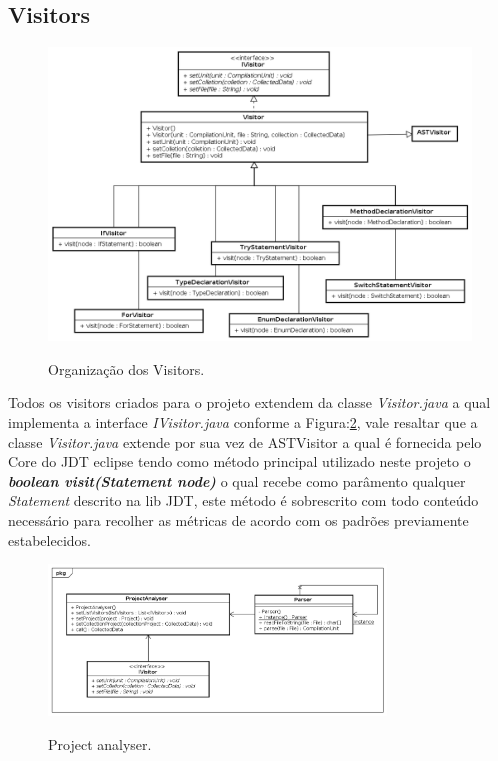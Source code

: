 \subsection{Visitors}
\begin{figure}[h]
\center
\includegraphics[width=1.0\textwidth]{Imagens/Visitors}
\label{fig:arqVisitor}
\caption{Organização dos Visitors.}
\end{figure}

Todos os visitors criados para o projeto extendem da classe \textit{Visitor.java} a qual implementa a interface \textit{IVisitor.java} conforme a Figura:\ref{fig:ProjectAnalyser}, vale resaltar que a classe \textit{Visitor.java} extende por sua vez de ASTVisitor a qual é fornecida pelo Core do JDT eclipse tendo como método principal utilizado neste projeto o \textbf{{\it boolean visit(Statement node)}} o qual recebe como parâmento qualquer {\it Statement} descrito na lib JDT, este método é sobrescrito com todo conteúdo necessário para recolher as métricas de acordo com os padrões previamente estabelecidos.\\
\clearpage
\begin{figure}[h]
	\center
	\includegraphics[width=0.8\textwidth]{Imagens/ProjectAnalyser}
	\label{fig:ProjectAnalyser}
	\caption{Project analyser.}
\end{figure}

